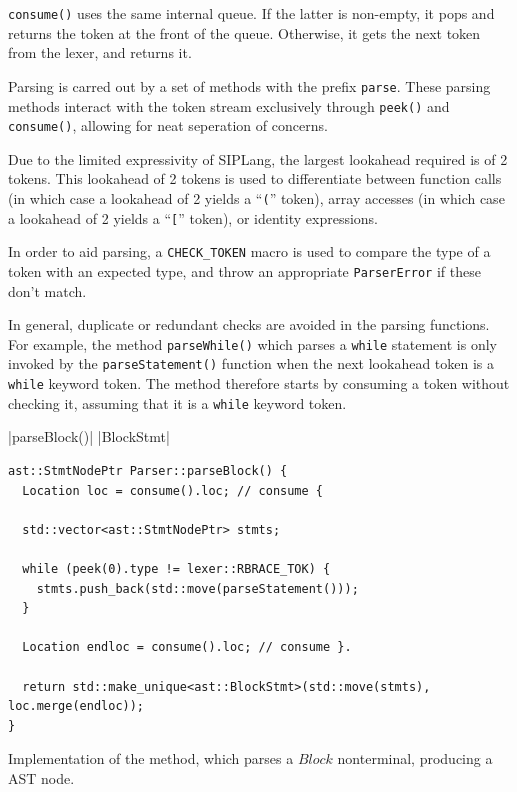 \documentclass[11pt,a4paper]{scrartcl}
\begin{document}
\verb!consume()! uses the same internal queue. If the latter is non-empty, it pops and returns the token at the front of the queue. Otherwise, it gets the next token from the lexer, and returns it.

Parsing is carred out by a set of methods with the prefix \verb|parse|. These parsing methods interact with the token stream exclusively through \verb|peek()| and \verb|consume()|, allowing for neat seperation of concerns.

Due to the limited expressivity of SIPLang, the largest lookahead required is of 2 tokens. This lookahead of 2 tokens is used to differentiate between function calls (in which case a lookahead of 2 yields a ``\verb|(|'' token), array accesses (in which case a lookahead of 2 yields a ``\verb|[|'' token), or identity expressions.

In order to aid parsing, a \verb!CHECK_TOKEN! macro is used to compare the type of a token with an expected type, and throw an appropriate \verb!ParserError! if these don't match.

In general, duplicate or redundant checks are avoided in the parsing functions. For example, the method \verb!parseWhile()! which parses a \verb!while! statement is only invoked by the \verb!parseStatement()! function when the next lookahead token is a \verb!while! keyword token. The method therefore starts by consuming a token without checking it, assuming that it is a \verb!while! keyword token.

|parseBlock()|
|BlockStmt|
\begin{lstfloat}[H]
\begin{verbatim}
ast::StmtNodePtr Parser::parseBlock() {
  Location loc = consume().loc; // consume {

  std::vector<ast::StmtNodePtr> stmts;

  while (peek(0).type != lexer::RBRACE_TOK) {
    stmts.push_back(std::move(parseStatement()));
  }

  Location endloc = consume().loc; // consume }.

  return std::make_unique<ast::BlockStmt>(std::move(stmts), loc.merge(endloc));
}
\end{verbatim}
  \caption{Implementation of the \protect{} method, which parses a $Block$ nonterminal, producing a \protect{} AST node.}~\label{lst:parseBlock}
\end{lstfloat}

\pagebreak
\end{document}

